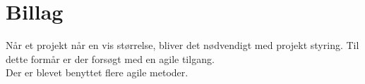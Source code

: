 \newpage
\section{Billag}

Når et projekt når en vis størrelse, bliver det nødvendigt med projekt styring. Til dette formår er der forsøgt med en agile tilgang.\\

Der er blevet benyttet flere agile metoder.
